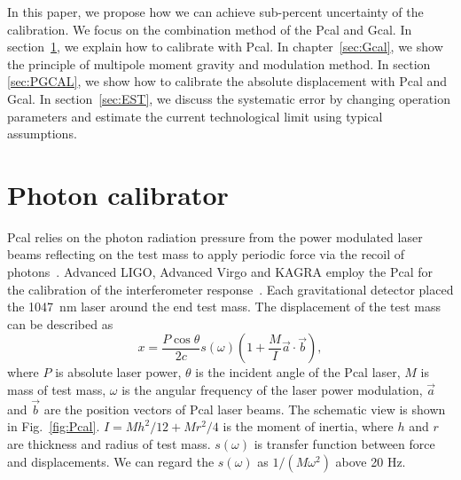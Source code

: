 \documentclass[%
 reprint,
superscriptaddress,
 amsmath,amssymb,
 aps,
]{revtex4-1}
\begin{document}
In this paper, we propose how we can achieve sub-percent uncertainty of the calibration. We focus on the combination method of the Pcal and Gcal.
In section~\ref{sec:Pcal}, we explain how to calibrate with Pcal. In chapter~\ref{sec:Gcal}, we show the principle of multipole moment gravity and modulation method.
In section \ref{sec:PGCAL}, we show how to calibrate the absolute displacement with Pcal and Gcal. In section~\ref{sec:EST}, we discuss the systematic error by changing operation parameters and estimate the current technological limit using typical assumptions. 

\section{Photon calibrator} \label{sec:Pcal}
Pcal relies on the photon radiation pressure from the power modulated laser beams reflecting on the test mass to apply periodic force via the recoil of photons~\cite{doi:10.1063/1.4967303}. 
Advanced LIGO, Advanced Virgo and KAGRA employ the Pcal for the calibration of the interferometer response~\cite{0264-9381-34-1-015002, KAGRA_Pcal,0264-9381-32-2-024001}. Each gravitational detector placed the 1047~nm laser around the end test mass. The displacement of the test mass can be described as
\begin{equation}
 x = \frac{P \cos{\theta}}{2c} s(\omega)\left(1+\frac{M}{I}\vec{a} \cdot \vec{b} \right) , \label{eq:pcal}
\end{equation}
where $P$ is absolute laser power, $\theta$ is the incident angle of the Pcal laser, $M$ is  mass of test mass, $\omega$ is the angular frequency of the laser power modulation, $\vec{a}$ and $\vec{b}$ are the position vectors of Pcal laser beams. The schematic view is shown in Fig.~\ref{fig:Pcal}. $I=Mh^2/12+Mr^2/4$ is the moment of inertia, where $h$ and  $r$ are thickness and radius of test mass. $s(\omega)$ is transfer function between force and displacements. We can regard the $s(\omega)$ as $1/(M \omega^2)$ above 20 Hz. 
\end{document}
